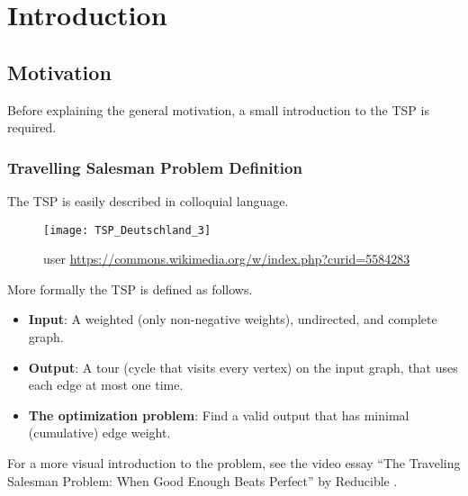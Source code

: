\section{Introduction}

\subsection{Motivation}

Before explaining the general motivation, a small introduction to the \ac{TSP} is required.

\subsubsection{Travelling Salesman Problem Definition}

The \ac{TSP} is easily described in colloquial language.

\begin{figure}[H]
\begin{minipage}{0.45\textwidth}
  \texttt{[image: TSP\_Deutschland\_3]}
  \tiny

  user  \url{https://commons.wikimedia.org/w/index.php?curid=5584283}
\end{minipage}
\begin{minipage}{0.45\textwidth}

\cite{song_solving_2021}
\end{minipage}
\end{figure}

More formally the \ac{TSP} is defined as follows.
\begin{itemize}
  \item \textbf{Input}: A weighted (only non-negative weights), undirected, and complete graph.
  \item \textbf{Output}: A tour (cycle that visits every vertex) on the input graph, that uses each edge at most one time.
  \item \textbf{The optimization problem}: Find a valid output that has minimal (cumulative) edge weight.
\end{itemize}

For a more visual introduction to the problem, see the video essay ``The Traveling Salesman Problem: When Good Enough Beats Perfect'' by Reducible \cite{reducible_traveling_2022}.

